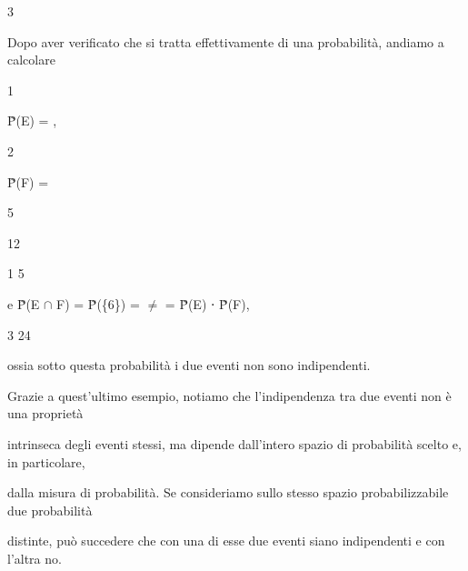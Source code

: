 \documentclass[a4paper,portrait,12pt]{article}
\begin{document}
3





\begin{flushleft}
Dopo aver verificato che si tratta effettivamente di una probabilit\`{a}, andiamo a calcolare
\end{flushleft}


1


\begin{flushleft}
P̃(E) = ,
\end{flushleft}


2





\begin{flushleft}
P̃(F) =
\end{flushleft}





5


12





1 5


\begin{flushleft}
e P̃(E $\cap$ F) = P̃(\{6\}) = $\neq$ = P̃(E) ⋅ P̃(F),
\end{flushleft}


3 24





\begin{flushleft}
ossia sotto questa probabilit\`{a} i due eventi non sono indipendenti.
\end{flushleft}


\begin{flushleft}
Grazie a quest'ultimo esempio, notiamo che l'indipendenza tra due eventi non \`{e} una propriet\`{a}
\end{flushleft}


\begin{flushleft}
intrinseca degli eventi stessi, ma dipende dall'intero spazio di probabilit\`{a} scelto e, in particolare,
\end{flushleft}


\begin{flushleft}
dalla misura di probabilit\`{a}. Se consideriamo sullo stesso spazio probabilizzabile due probabilit\`{a}
\end{flushleft}


\begin{flushleft}
distinte, pu\`{o} succedere che con una di esse due eventi siano indipendenti e con l'altra no.
\end{flushleft}
\end{document}
